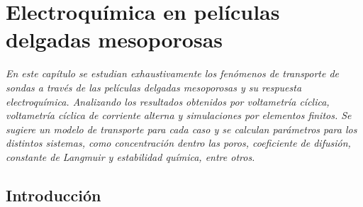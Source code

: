  \newcommand{\NoBiblioEQ}[1]{
 \ifthenelse{\equal{#1}{verdadero}}{}{}
 \NoBiblioEQ{verdadero}}


 \FormatoCapituloDosLineas
 
 \chapter{Electroquímica en películas delgadas mesoporosas}
 \label{chap:Electroquimica}

 \thispagestyle{empty}
	
 \noindent\textit{En este capítulo se estudian exhaustivamente los fenómenos de transporte de sondas a través de las películas delgadas mesoporosas y su respuesta electroquímica. Analizando los resultados obtenidos por voltametría cíclica, voltametría cíclica de corriente alterna y simulaciones por elementos finitos. Se sugiere un modelo de transporte para cada caso y se calculan parámetros para los distintos sistemas, como concentración dentro las poros, coeficiente de difusión, constante de Langmuir y estabilidad química,
  entre otros.}

 \vfill
 \minitoc
 \newpage

\section{Introducción}

